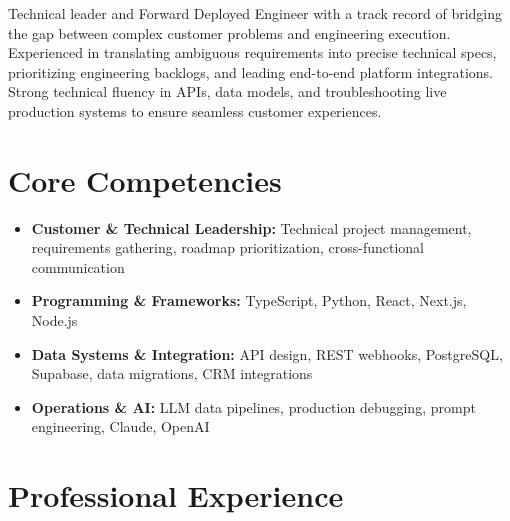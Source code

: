 \documentclass[11pt,a4paper,sans]{moderncv}
\begin{document}
\makecvtitle

Technical leader and Forward Deployed Engineer with a track record of bridging the gap between complex customer problems and engineering execution. Experienced in translating ambiguous requirements into precise technical specs, prioritizing engineering backlogs, and leading end-to-end platform integrations. Strong technical fluency in APIs, data models, and troubleshooting live production systems to ensure seamless customer experiences.

\vspace{3pt}
\section{Core Competencies}
\begin{itemize}
\item \textbf{Customer \& Technical Leadership:} Technical project management, requirements gathering, roadmap prioritization, cross-functional communication
\item \textbf{Programming \& Frameworks:} TypeScript, Python, React, Next.js, Node.js
\item \textbf{Data Systems \& Integration:} API design, REST webhooks, PostgreSQL, Supabase, data migrations, CRM integrations
\item \textbf{Operations \& AI:} LLM data pipelines, production debugging, prompt engineering, Claude, OpenAI
\end{itemize}

\section{Professional Experience}
\vspace{1pt}
\end{document}
